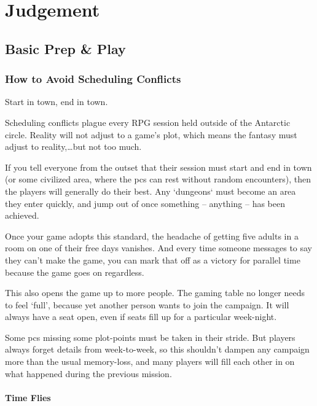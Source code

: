 \chapter[Bastion of Judgement]{Judgement}

\section{Basic Prep \& Play}

\begin{multicols}{2}

\subsection{How to Avoid Scheduling Conflicts}

Start in town, end in town.

Scheduling conflicts plague every RPG session held outside of the Antarctic circle.
Reality will not adjust to a game's plot, which means the fantasy must adjust to reality,\ldots but not too much.

If you tell everyone from the outset that their session must start and end in town (or some civilized area, where the \glspl{pc} can rest without random encounters), then the players will generally do their best.
Any `dungeons` must become an area they enter quickly, and jump out of once something -- anything -- has been achieved.

Once your game adopts this standard, the headache of getting five adults in a room on one of their free days vanishes.
And every time someone messages to say they can't make the game, you can mark that off as a victory for parallel time because the game goes on regardless.

This also opens the game up to more people.
The gaming table no longer needs to feel `full', because yet another person wants to join the campaign.
It will always have a seat open, even if seats fill up for a particular week-night.

Some \glspl{pc} missing some plot-points must be taken in their stride.
But players always forget details from week-to-week, so this shouldn't dampen any campaign more than the usual memory-loss, and many players will fill each other in on what happened during the previous mission.

\subsubsection{Time Flies}


\end{multicols}
